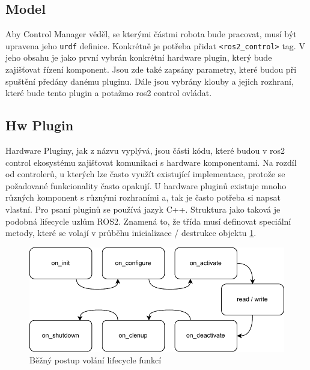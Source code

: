 \subsection*{Model}
Aby Control Manager věděl, se kterými částmi robota bude pracovat, musí být upravena jeho \verb|urdf| definice. Konkrétně je potřeba přidat \verb|<ros2_control>| tag. V jeho obsahu je jako první vybrán konkrétní hardware plugin, který bude zajišťovat řízení komponent. Jsou zde také zapsány parametry, které budou při spuštění předány danému pluginu. Dále jsou vybrány klouby a jejich rozhraní, které bude tento plugin a potažmo ros2 control ovládat. 

\subsection*{Hw Plugin}
Hardware Pluginy, jak z názvu vyplývá, jsou části kódu, které budou v ros2 control ekosystému zajišťovat komunikaci s hardware komponentami. Na rozdíl od controlerů, u kterých lze často využít existující implementace, protože se požadované funkcionality často opakují. U hardware pluginů existuje mnoho různých komponent s různými rozhraními a, tak je často potřeba si napsat vlastní. Pro psaní pluginů se používá jazyk C++. Struktura jako taková je podobná lifecycle uzlům ROS2. Znamená to, že třída musí definovat speciální metody, které se volají v průběhu inicializace / destrukce objektu \ref{fig:lifecycle_diagram}.

\begin{figure}[h!]
	\centering
	\includegraphics[scale=0.8]{obrazky-figures/ros2_control_wh_plugin_transitions.pdf}
	\caption{Běžný postup volání lifecycle funkcí}
	\label{fig:lifecycle_diagram}
\end{figure}

